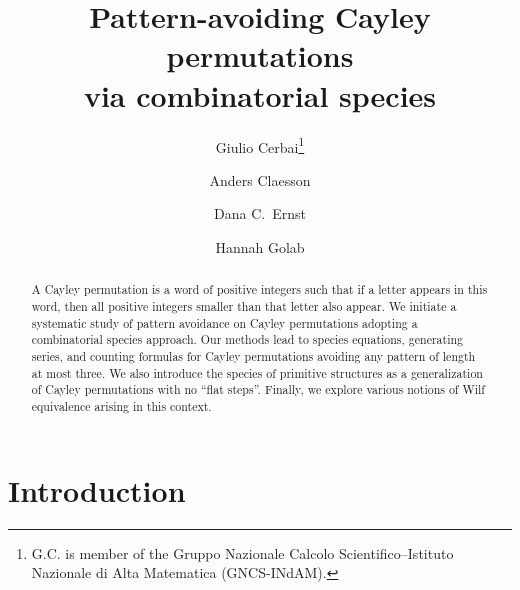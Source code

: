 \documentclass[a4paper, 11pt]{article}
\theoremstyle{definition}
\begin{document}

\title{Pattern-avoiding Cayley permutations\\ via combinatorial species}

\author[1]{Giulio Cerbai\thanks{G.C. is member of the Gruppo
Nazionale Calcolo Scientifico--Istituto Nazionale di Alta
Matematica (GNCS-INdAM).}}
\author[1]{Anders Claesson}
\author[2]{Dana C.~Ernst}
\author[2]{Hannah Golab}
\date{}

\maketitle
\begin{abstract}
A Cayley permutation is a word of positive integers such that if a letter
appears in this word, then all positive integers smaller than that letter also appear.
We initiate a systematic study of pattern avoidance on Cayley permutations
adopting a combinatorial species approach. Our methods lead to species
equations, generating series, and counting formulas for Cayley permutations
avoiding any pattern of length at most three.
We also introduce the species of primitive structures as a generalization of Cayley permutations with no ``flat steps''. Finally, we explore 
various notions of Wilf equivalence arising in this context.
\end{abstract}

\section{Introduction}
\thispagestyle{empty} %
\end{document}
